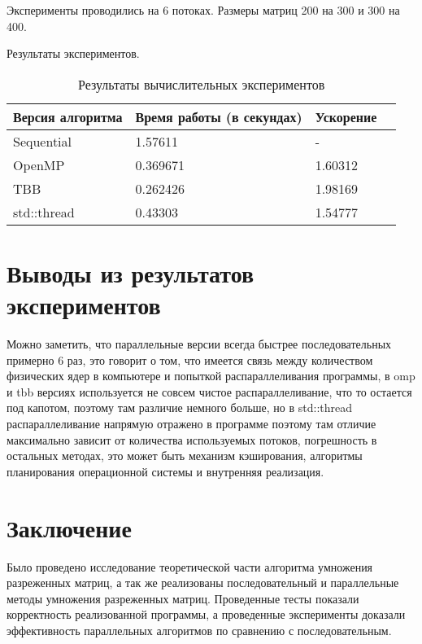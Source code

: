 \documentclass{report}
\begin{document}
\begin{enumerate}
\par Эксперименты проводились на 6 потоках. Размеры матриц 200 на 300 и 300 на 400.

\par Результаты экспериментов.
\begin{table}[!h]
\caption{Результаты вычислительных экспериментов}
\centering
\begin{tabular}{| p{2cm} | p{3cm} | p{4cm} | p{2cm} |}
\hline
Версия алгоритма & Время работы (в секундах) & Ускорение  \\[5pt]
\hline
Sequential        & 1.57611        & -           \\
OpenMP            & 0.369671       & 1.60312      \\
TBB               & 0.262426       & 1.98169       \\
std::thread       & 0.43303        & 1.54777        \\

\hline
\end{tabular}
\end{table}

\newpage

\section*{Выводы из результатов экспериментов}
Можно заметить, что параллельные версии всегда быстрее последовательных примерно 6 раз, это говорит о том, что имеется связь между количеством физических ядер в компьютере и попыткой распараллеливания программы, в omp и tbb версиях используется не совсем чистое распараллеливание, что то остается под капотом, поэтому там различие немного больше, но в std::thread распараллеливание напрямую отражено в программе поэтому там отличие максимально зависит от количества используемых потоков, погрешность в остальных методах, это может быть механизм кэширования, алгоритмы планирования операционной системы и внутренняя реализация.
\newpage

\section*{Заключение}
Было проведено исследование теоретической части алгоритма умножения разреженных матриц, а так же реализованы последовательный и параллельные методы умножения разреженных матриц. Проведенные тесты показали корректность реализованной программы, а проведенные эксперименты доказали эффективность параллельных алгоритмов по сравнению с последовательным.
\newpage


\end{enumerate}
\end{document}

